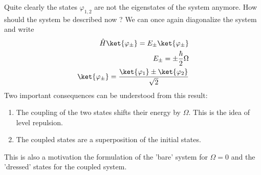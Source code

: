 Quite clearly the states $\varphi_{1,2}$ are not the eigenstates of the system anymore. How should the system be described now ? We can once again diagonalize the system and write
\begin{align}
\hat{H}\ket{\varphi_{\pm}} = E_{\pm}\ket{\varphi_\pm}\\
E_{\pm} = \pm\frac{\hbar}{2}\Omega\\
\ket{\varphi_\pm} = \frac{\ket{\varphi_1}\pm\ket{\varphi_2}}{\sqrt{2}}
\end{align}
Two important consequences can be understood from this result:
\begin{enumerate}
\item The coupling of the two states shifts their energy by $\Omega$. This is the idea of level repulsion.
\item The coupled states are a superposition of the initial states.
\end{enumerate}
This is also a motivation the formulation of the 'bare' system for $\Omega = 0$ and the 'dressed' states for the coupled system.